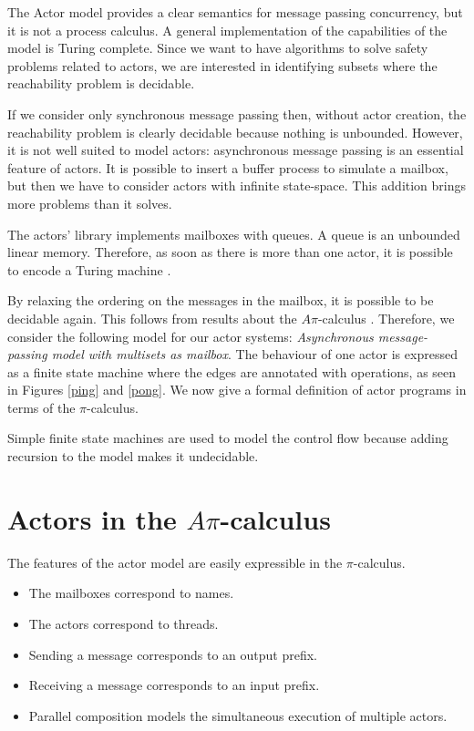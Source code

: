 \documentclass[a4paper]{report}
\numberwithin{algorithm}{chapter}
\begin{document}
The Actor model \cite{DBLP:conf/ijcai/HewittBS73,WilliamClinger81,GulAgha86} provides a clear semantics for message passing concurrency, but it is not a process calculus.
A general implementation of the capabilities of the model is Turing complete.
Since we want to have algorithms to solve safety problems related to actors, we are interested in identifying subsets where the reachability problem is decidable.

If we consider only synchronous message passing then, without actor creation, the reachability problem is clearly decidable because nothing is unbounded.
However, it is not well suited to model actors: asynchronous message passing is an essential feature of actors.
It is possible to insert a buffer process to simulate a mailbox, but then we have to consider actors with infinite state-space.
This addition brings more problems than it solves.

The \scala{} actors' library implements mailboxes with queues.
A queue is an unbounded linear memory.
Therefore, as soon as there is more than one actor, it is possible to encode a Turing machine \cite{DBLP:journals/jacm/BrandZ83}.

By relaxing the ordering on the messages in the mailbox, it is possible to be decidable again.
This follows from results about the $A\pi$-calculus \cite{DBLP:journals/njc/AmadioM02}.
Therefore, we consider the following model for our actor systems: \emph{Asynchronous message-passing model with multisets as mailbox}.
The behaviour of one actor is expressed as a finite state machine where the edges are annotated with operations, as seen in Figures \ref{ping} and \ref{pong}. 
We now give a formal definition of actor programs in terms of the $\pi$-calculus.

\begin{rem}
Simple finite state machines are used to model the control flow because adding recursion to the model makes it undecidable\cite{DBLP:journals/toplas/Ramalingam00}.
\end{rem}

\section{Actors in the $A\pi$-calculus}

The features of the actor model are easily expressible in the $\pi$-calculus.
\begin{itemize}
\item The mailboxes correspond to names.
\item The actors correspond to threads.
\item Sending a message corresponds to an output prefix.
\item Receiving a message corresponds to an input prefix.
\item Parallel composition models the simultaneous execution of multiple actors.
\end{itemize}
\end{document}
